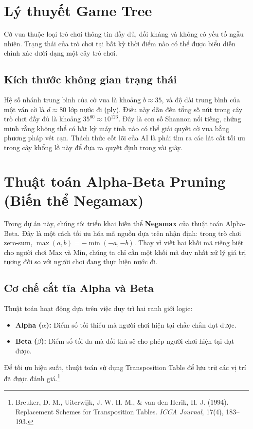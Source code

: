 \section{Lý thuyết Game Tree}

Cờ vua thuộc loại trò chơi thông tin đầy đủ, đối kháng và không có yếu tố ngẫu nhiên. Trạng thái của trò chơi tại bất kỳ thời điểm nào có thể được biểu diễn chính xác dưới dạng một cây trò chơi.

\subsection{Kích thước không gian trạng thái}
Hệ số nhánh trung bình của cờ vua là khoảng $b \approx 35$, và độ dài trung bình của một ván cờ là $d \approx 80$ lớp nước đi (ply). Điều này dẫn đến tổng số nút trong cây trò chơi đầy đủ là khoảng $35^{80} \approx 10^{123}$. Đây là con số Shannon nổi tiếng, chứng minh rằng không thể có bất kỳ máy tính nào có thể giải quyết cờ vua bằng phương pháp vét cạn. Thách thức cốt lõi của AI là phải tìm ra các lát cắt tối ưu trong cây khổng lồ này để đưa ra quyết định trong vài giây.

\section{Thuật toán Alpha-Beta Pruning (Biến thể Negamax)}

Trong dự án này, chúng tôi triển khai biến thể \textbf{Negamax} của thuật toán Alpha-Beta. Đây là một cách tối ưu hóa mã nguồn dựa trên nhận định: trong trò chơi zero-sum, $\max(a, b) = -\min(-a, -b)$. Thay vì viết hai khối mã riêng biệt cho người chơi Max và Min, chúng ta chỉ cần một khối mã duy nhất xử lý giá trị tương đối so với người chơi đang thực hiện nước đi.

\subsection{Cơ chế cắt tỉa Alpha và Beta}
Thuật toán hoạt động dựa trên việc duy trì hai ranh giới logic:
\begin{itemize}
    \item \textbf{Alpha ($\alpha$):} Điểm số tối thiểu mà người chơi hiện tại chắc chắn đạt được.
    \item \textbf{Beta ($\beta$):} Điểm số tối đa mà đối thủ sẽ cho phép người chơi hiện tại đạt được.
\end{itemize}

Để tối ưu hiệu suất, thuật toán sử dụng Transposition Table để lưu trữ các vị trí đã được đánh giá.\footnote{Breuker, D. M., Uiterwijk, J. W. H. M., \& van den Herik, H. J. (1994). Replacement Schemes for Transposition Tables. \textit{ICCA Journal}, 17(4), 183–193.}

